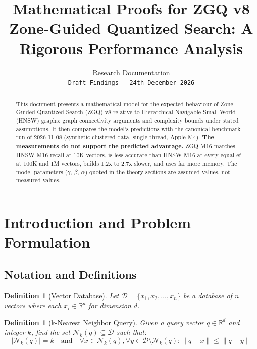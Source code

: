 \documentclass[11pt,a4paper]{article}
\title{%
    \textbf{Mathematical Proofs for ZGQ v8}\\[0.5em]
    \large Zone-Guided Quantized Search: A Rigorous Performance Analysis
}
\author{%
    Research Documentation\\
    \texttt{Draft Findings - 24th December 2026}
}
\date{}
\newtheorem{definition}[theorem]{Definition}
\newcommand{\ef}{\text{ef}}
\begin{document}
\maketitle

\begin{abstract}
This document presents a mathematical model for the expected behaviour of Zone-Guided Quantized Search (ZGQ) v8 relative to Hierarchical Navigable Small World (HNSW) graphs: graph connectivity arguments and complexity bounds under stated assumptions. It then compares the model's predictions with the canonical benchmark run of 2026-11-08 (synthetic clustered data, single thread, Apple M4). \textbf{The measurements do not support the predicted advantage.} ZGQ-M16 matches HNSW-M16 recall at 10K vectors, is less accurate than HNSW-M16 at every equal $\ef$ at 100K and 1M vectors, builds 1.2x to 2.7x slower, and uses far more memory. The model parameters ($\gamma$, $\beta$, $\alpha$) quoted in the theory sections are assumed values, not measured values.
\end{abstract}

\tableofcontents
\newpage

\section{Introduction and Problem Formulation}

\subsection{Notation and Definitions}

\begin{definition}[Vector Database]
Let $\mathcal{D} = \{x_1, x_2, \ldots, x_n\}$ be a database of $n$ vectors where each $x_i \in \mathbb{R}^d$ for dimension $d$.
\end{definition}

\begin{definition}[k-Nearest Neighbor Query]
Given a query vector $q \in \mathbb{R}^d$ and integer $k$, find the set $\mathcal{N}_k(q) \subseteq \mathcal{D}$ such that:
\[
|\mathcal{N}_k(q)| = k \quad \text{and} \quad \forall x \in \mathcal{N}_k(q), \forall y \in \mathcal{D} \setminus \mathcal{N}_k(q): \|q - x\| \leq \|q - y\|
\]
\end{definition}
\end{document}
